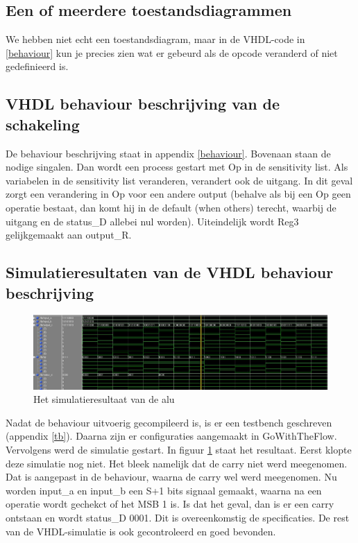 \documentclass{article}
\begin{document}
\subsection{Een of meerdere toestandsdiagrammen }
We hebben niet echt een toestandsdiagram, maar in de VHDL-code in \ref{behaviour} kun je precies zien wat er gebeurd als de opcode veranderd of niet gedefinieerd is. 
\subsection{VHDL behaviour beschrijving van de schakeling}
De behaviour beschrijving staat in appendix \ref{behaviour}. Bovenaan staan de nodige singalen. Dan wordt een process gestart met Op in de sensitivity list. Als variabelen in de sensitivity list veranderen, verandert ook de uitgang. In dit geval zorgt een verandering in Op voor een andere output (behalve als bij een Op geen operatie bestaat, dan komt hij in de default (when others) terecht, waarbij de uitgang en de status\_D allebei nul worden). Uiteindelijk wordt Reg3 gelijkgemaakt aan output\_R. 
\subsection{Simulatieresultaten van de VHDL behaviour beschrijving}
\begin{figure} [h!]
\includegraphics [scale = .35]{figures/simtb}
\caption{Het simulatieresultaat van de alu}
\label{2}
\end{figure}
Nadat de behaviour uitvoerig gecompileerd is, is er een testbench geschreven (appendix \ref{tb}). Daarna zijn er configuraties aangemaakt in GoWithTheFlow. Vervolgens werd de simulatie gestart. In figuur \ref{2} staat het resultaat.
Eerst klopte deze simulatie nog niet. Het bleek namelijk dat de carry niet werd meegenomen. Dat is aangepast in de behaviour, waarna de carry wel werd meegenomen. Nu worden input\_a en input\_b een S+1 bits signaal gemaakt, waarna na een operatie wordt gechekct of het MSB 1 is. Is dat het geval, dan is er een carry ontstaan en wordt status\_D 0001.  Dit is overeenkomstig de specificaties. De rest van de VHDL-simulatie is ook gecontroleerd en goed bevonden. 
\end{document}
